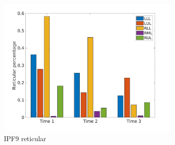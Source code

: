 \begin{figure}[H]
\begin{subfigure}{.46\linewidth}%
  \includegraphics[width=\linewidth,trim={{.0\wd0} {.0\wd0} {.0\wd0} {.0\wd0}},clip]{Appendix/Image_AppexA/LobarDistribution/IPF9ReticularLobarRegionDiseaseDistributionOverTime.jpg}
  \caption{IPF9 reticular}
  \label{fig:IPF9LobarRegionDiseaseDistributionOverTime-b}
\end{subfigure}
\begin{subfigure}{.46\linewidth}%

\end{subfigure}
\end{figure}

